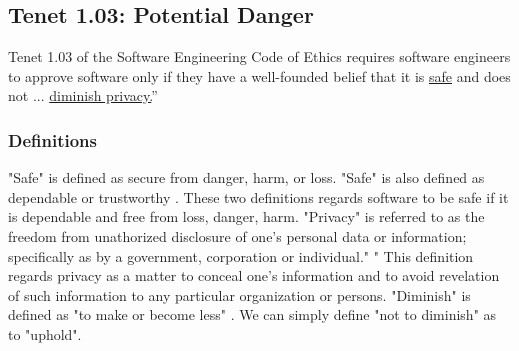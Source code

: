 \subsection{Tenet 1.03: Potential Danger}
Tenet 1.03 of the Software Engineering Code of Ethics requires software engineers to approve software only if they have a well-founded belief that it is \uline{safe} and does not ... \uline{diminish privacy.}'' \cite{code} 

\subsubsection{Definitions}
"Safe" is defined as secure from danger, harm, or loss. \cite{define-safe} "Safe" is also defined as dependable or trustworthy \cite{define-safe2}. These two definitions regards software to be safe if it is dependable and free from loss, danger, harm. 
"Privacy" is referred to as the freedom from unathorized disclosure of one's personal data or information; specifically as by a government, corporation or individual." \cite{define-privacy}" This definition regards privacy as a matter to conceal one's information and to avoid revelation of such information to any particular organization or persons. 
"Diminish" is defined as "to make or become less" \cite{define-diminish}. We can simply define "not to diminish" as to  "uphold". 





















